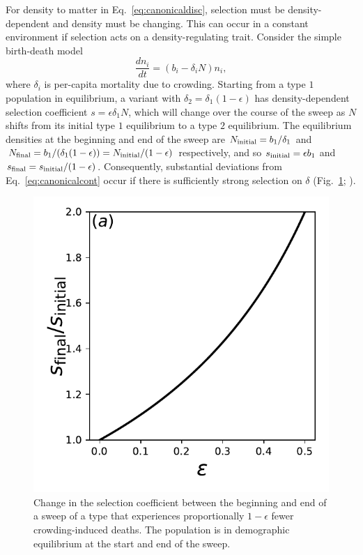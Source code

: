 \documentclass[12pt]{article}
\begin{document}
For density to matter in Eq.~\eqref{eq:canonicaldisc}, selection must be density-dependent and density must be changing. This can occur in a constant environment if selection acts on a density-regulating trait. Consider the simple birth-death model \citep{kostitzin_1939} 
\begin{equation}
\frac{d n_i}{dt}=(b_i -\delta_iN) n_i, \label{eq:simplebirthdeath}
\end{equation}
where $\delta_i$ is per-capita mortality due to crowding. Starting from a type $1$ population in equilibrium, a variant with $\delta_2=\delta_1(1-\epsilon)$ has density-dependent selection coefficient $s=\epsilon \delta_1 N$, which will change over the course of the sweep as $N$ shifts from its initial type $1$ equilibrium to a type $2$ equilibrium. The equilibrium densities at the beginning and end of the sweep are $N_{\rm initial}=b_1/\delta_1$ and $N_{\rm final}=b_1/(\delta_1(1-\epsilon))=N_{\rm initial}/(1-\epsilon)$ respectively, and so $s_{\rm initial}= \epsilon b_1$ and $s_{\rm final}=s_{\rm initial}/(1-\epsilon)$. Consequently, substantial deviations from Eq.~\eqref{eq:canonicalcont} occur if there is sufficiently strong selection on $\delta$ (Fig.~\ref{fig:strengthofselection}; \citealt{kimura_1978,kimura1969natural}). 

\begin{figure}
\centering
\includegraphics[scale=0.8]{strengthofselection.pdf}
\caption{\label{fig:strengthofselection} Change in the selection coefficient between the beginning and end of a sweep of a type that experiences proportionally $1-\epsilon$ fewer crowding-induced deaths. The population is in demographic equilibrium at the start and end of the sweep.}
\end{figure}
\end{document}
